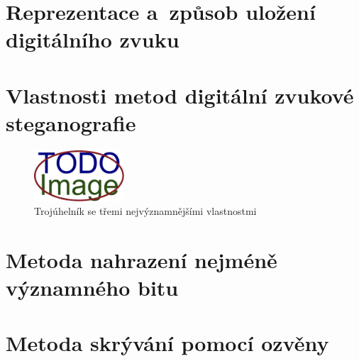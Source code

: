 
\blindtext

\section{Reprezentace a~způsob uložení digitálního zvuku}
\label{sec:digital-sound-representation}


\blindtext

\blindtext

\section{Vlastnosti metod digitální zvukové steganografie}
\label{sec:method-properties}


\blindtext

\blindtext

\begin{figure}[hbt]
    \centering
    \includegraphics[width=0.3\textwidth]{obrazky/placeholder.pdf}
    \caption{Trojúhelník se třemi nejvýznamnějšími vlastnostmi}
    \label{pic:method-property-triangle}
\end{figure}

\section{Metoda nahrazení nejméně významného bitu}
\label{sec:lsb}


\blindtext

\blindtext

\blindtext

\section{Metoda skrývání pomocí ozvěny}
\label{sec:echo-hiding}


\blindtext

\blindtext

